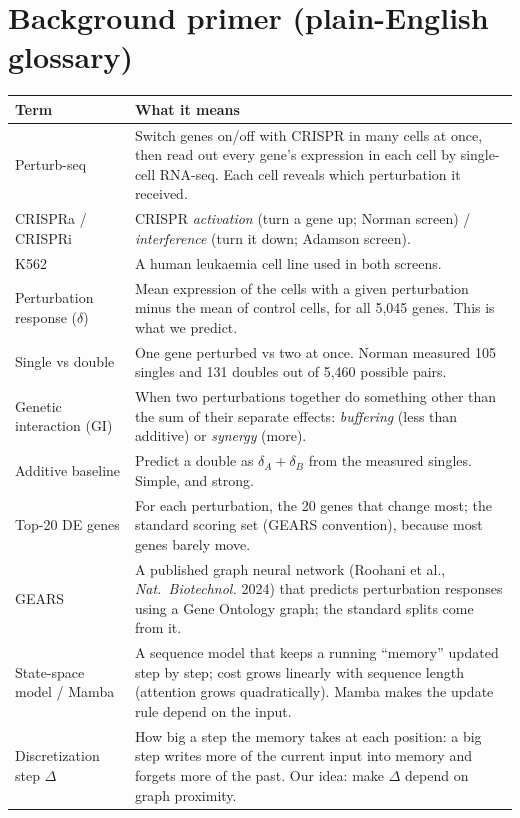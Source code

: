 \documentclass[10.5pt]{article}
\begin{document}
\section{Background primer (plain-English glossary)}

\begin{tabular}{@{}p{3.6cm}p{11.9cm}@{}}
\toprule
Term & What it means\\
\midrule
Perturb-seq & Switch genes on/off with CRISPR in many cells at once, then read out every gene's expression in
each cell by single-cell RNA-seq. Each cell reveals which perturbation it received.\\
CRISPRa / CRISPRi & CRISPR \emph{activation} (turn a gene up; Norman screen) / \emph{interference} (turn it
down; Adamson screen).\\
K562 & A human leukaemia cell line used in both screens.\\
Perturbation response ($\delta$) & Mean expression of the cells with a given perturbation minus the mean of
control cells, for all 5,045 genes. This is what we predict.\\
Single vs double & One gene perturbed vs two at once. Norman measured 105 singles and 131 doubles out of 5,460
possible pairs.\\
Genetic interaction (GI) & When two perturbations together do something other than the sum of their separate
effects: \emph{buffering} (less than additive) or \emph{synergy} (more).\\
Additive baseline & Predict a double as $\delta_A+\delta_B$ from the measured singles. Simple, and strong.\\
Top-20 DE genes & For each perturbation, the 20 genes that change most; the standard scoring set (GEARS
convention), because most genes barely move.\\
GEARS & A published graph neural network (Roohani et al., \emph{Nat.\ Biotechnol.} 2024) that predicts
perturbation responses using a Gene Ontology graph; the standard splits come from it.\\
State-space model / Mamba & A sequence model that keeps a running ``memory'' updated step by step; cost grows
linearly with sequence length (attention grows quadratically). Mamba makes the update rule depend on the
input.\\
Discretization step $\Delta$ & How big a step the memory takes at each position: a big step writes more of the
current input into memory and forgets more of the past. Our idea: make $\Delta$ depend on graph proximity.\\

\end{tabular}
\end{document}
